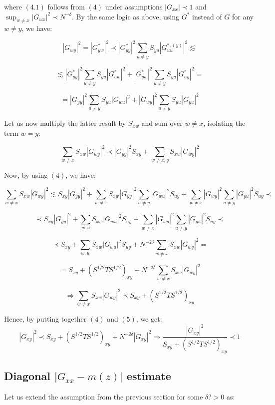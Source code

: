 \documentclass[11pt]{article}
\begin{document}
where $(4.1)$ follows from $(4)$ under assumptions $|G_{xx}|\prec 1$ and $\sup_{w\neq x}|G_{wx}|^2\prec N^{-\delta}$. By the same logic as above, using $G^*$ instead of $G$ for any $w\neq y$, we have:

$$|G_{wy}|^2 =|G_{yw}^*|^2 \prec |G_{yy}^*|^2\sum_{u\neq y}S_{yu}|G^{*,(y)}_{uw}|^2 \lesssim $$

$$\lesssim |G_{yy}^*|^2\sum_{u\neq y}S_{yu}|G^{*}_{uw}|^2 +|G_{yw}^*|^2\sum_{u\neq y}S_{yu}|G^{*}_{uy}|^2 =$$

  

$$=|G_{yy}|^2\sum_{u\neq y}S_{yu}|G_{wu}|^2 +|G_{wy}|^2\sum_{u\neq y}S_{yu}|G_{yu}|^2 $$

Let us now multiply the latter result by $S_{xw}$ and sum over $w\neq x$, isolating the term $w=y$: 

$$\sum_{w\neq x} S_{xw}|G_{wy}|^2\prec |G_{yy}|^2S_{xy}+\sum_{w\neq x,y}S_{xw}|G_{wy}|^2$$

Now, by using $(4)$, we have:

$$\sum_{w\neq x} S_{xw}|G_{wy}|^2 \lesssim S_{xy}|G_{yy}|^2+\sum_{w\neq z}S_{xw}|G_{yy}|^2\sum_{u\neq y}|G_{wu}|^2S_{uy}+\sum_{w\neq x}|G_{wy}|^2\sum_{u\neq y}|G_{yu}|^2S_{uy}\prec$$

$$\prec S_{xy}|G_{yy}|^2 + \sum_{w, u}S_{xw}|G_{wu}|^2S_{uy}+\sum_{w\neq x}|G_{wy}|^2\sum_{u\neq y}|G_{yu}|^2S_{uy}\prec $$

$$\prec S_{xy} + \sum_{w, u}S_{xw}|G_{wu}|^2S_{uy}+N^{-2\delta}\sum_{w\neq x} S_{xw}|G_{wy}|^2=$$

$$=S_{xy}+\left(S^{1/2}TS^{1/2}\right)_{xy}+N^{-2\delta}\sum_{w\neq x}S_{xw}|G_{wy}|^2$$

\begin{equation*}\Rightarrow \sum_{w\neq x} S_{xw}|G_{wy}|^2\prec S_{xy}+(S^{1/2}T S^{1/2})_{xy}\tag{5}\end{equation*}

Hence, by putting together $(4)$ and $(5)$, we get: $$|G_{xy}|^2\prec S_{xy} + (S^{1/2}TS^{1/2})_{xy}+ N^{-2\delta}|G_{xy}|^2 \Rightarrow \frac{|G_{xy}|^2}{S_{xy} + (S^{1/2}TS^{1/2})_{xy}}\prec 1$$

  

  

\subsection{Diagonal $|G_{xx}-m(z)|$ estimate}

Let us extend the assumption from the previous section for some $\delta?>0$ as:
\end{document}
